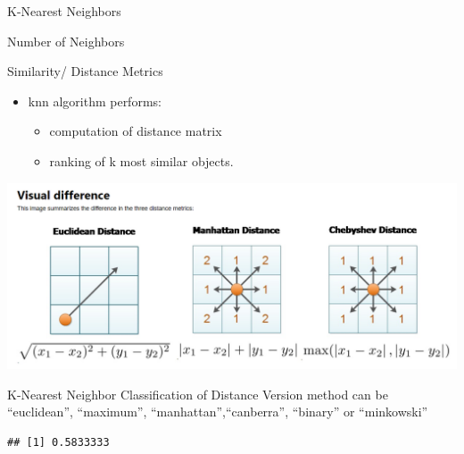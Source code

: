 \documentclass[ignorenonframetext,]{beamer}
\newenvironment{Shaded}{\begin{snugshade}}{\end{snugshade}}
\newcommand{\KeywordTok}[1]{\textcolor[rgb]{0.13,0.29,0.53}{\textbf{#1}}}
\newcommand{\DataTypeTok}[1]{\textcolor[rgb]{0.13,0.29,0.53}{#1}}
\newcommand{\DecValTok}[1]{\textcolor[rgb]{0.00,0.00,0.81}{#1}}
\newcommand{\StringTok}[1]{\textcolor[rgb]{0.31,0.60,0.02}{#1}}
\newcommand{\OperatorTok}[1]{\textcolor[rgb]{0.81,0.36,0.00}{\textbf{#1}}}
\newcommand{\NormalTok}[1]{#1}
\providecommand{\tightlist}{%
  \setlength{\itemsep}{0pt}\setlength{\parskip}{0pt}}
\begin{document}
\begin{frame}[fragile]{K-Nearest Neighbors}
\begin{block}{Number of Neighbors}
\end{block}

\begin{block}{Similarity/ Distance Metrics}

\begin{itemize}
\tightlist
\item
  knn algorithm performs:

  \begin{itemize}
  \tightlist
  \item
    computation of distance matrix
  \item
    ranking of k most similar objects.
  \end{itemize}
\end{itemize}

\includegraphics[width=600px]{knn3}

K-Nearest Neighbor Classification of Distance Version method can be
``euclidean'', ``maximum'', ``manhattan'',``canberra'', ``binary'' or
``minkowski''

\begin{Shaded}
\end{Shaded}

\begin{verbatim}
## [1] 0.5833333
\end{verbatim}


\end{block}
\end{frame}
\end{document}
